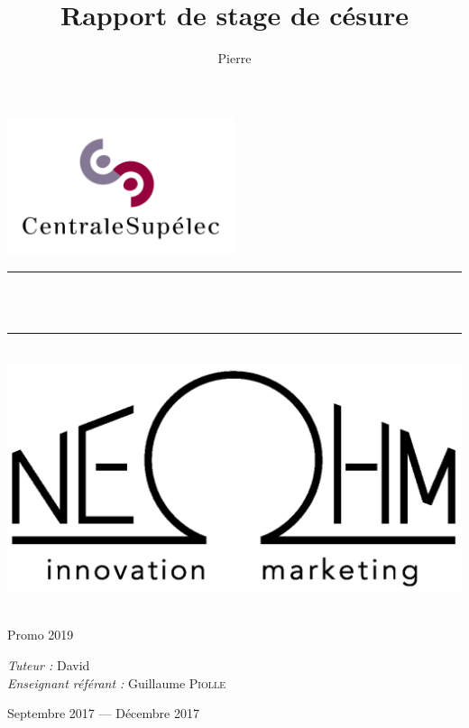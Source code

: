 \documentclass[a4paper, 12pt]{report}
\title{Rapport de stage de césure}
\author{Pierre \bsc{Gintrand}}
\newcommand{\HRule}{\rule{\linewidth}{0.5mm}}
\begin{document}
\sffamily %


\makeatletter %
\begin{titlepage}
\begin{center}

\includegraphics[width=0.5\textwidth]{figures/logos/centralesupelec_logo.png}~\\[3cm]

\HRule \\[0.4cm]
{ \huge \bfseries \@title \\[0.4cm] }

\HRule \\[2cm]

\includegraphics[scale=0.3]{figures/logos/neohm_logo.png}\\[2.5cm]

\begin{minipage}{0.35\textwidth}
  \begin{flushleft} \large
    \textbf{\@author}\\
    Promo 2019\\
  \end{flushleft}
\end{minipage}
\begin{minipage}{0.6\textwidth}
  \begin{flushright} \large
    \emph{Tuteur :} David \\
    \emph{Enseignant référant :} Guillaume \textsc{Piolle}
  \end{flushright}
\end{minipage}

\vfill

{\large Septembre 2017 — Décembre 2017}

\end{center}
\end{titlepage}
\makeatother %
\end{document}
